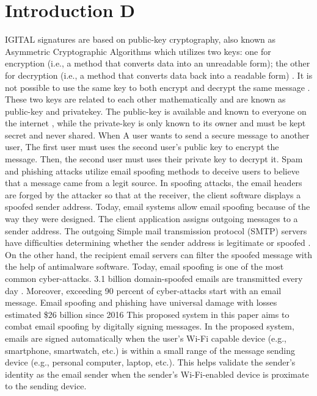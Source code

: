 \documentclass[sigconf]{acmart}
\begin{document}
\section{Introduction D}
IGITAL signatures are based on public-key cryptography, also known as Asymmetric Cryptographic Algorithms which utilizes two keys: one for encryption (i.e., a method that converts data into an unreadable form); the other for decryption (i.e., a method that converts data back into a readable form) \cite{ref8}. It is not possible to use the same key to both encrypt and decrypt the same message \cite{ref3}. These two keys are related to each other mathematically and are known as public-key and privatekey. The public-key is available and known to everyone on the internet , while the private-key is only known to its owner and must be kept secret and never shared. When A user wants to send a secure message to another user, The ﬁrst user must uses the second user's public key to encrypt the message. Then, the second user must uses their private key to decrypt it. Spam and phishing attacks utilize email spooﬁng methods to deceive users to believe that a message came from a legit source. In spooﬁng attacks, the email headers are forged by the attacker so that at the receiver, the client software displays a spoofed sender address. Today, email systems allow email spooﬁng because of the way they were designed. The client application assigns outgoing messages to a sender address. The outgoing Simple mail transmission protocol (SMTP) servers have difﬁculties determining whether the sender address is legitimate or spoofed \cite{ref1}. On the other hand, the recipient email servers can ﬁlter the spoofed message with the help of antimalware software. Today, email spooﬁng is one of the most common cyber-attacks. 3.1 billion domain-spoofed emails are transmitted every day \cite{ref9}. Moreover, exceeding 90 percent of cyber-attacks start with an email message. Email spooﬁng and phishing have universal damage with losses estimated \$26 billion since 2016 \cite{ref5} This proposed system in this paper aims to combat email spooﬁng by digitally signing messages. In the proposed system, emails are signed automatically when the user's Wi-Fi capable device (e.g., smartphone, smartwatch, etc.) is within a small range of the message sending device (e.g., personal computer, laptop, etc.). This helps validate the sender's identity as the email sender when the sender's Wi-Fi-enabled device is proximate to the sending device.
\end{document}
